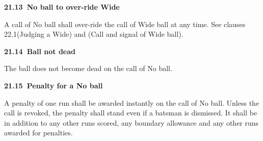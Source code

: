 \documentclass[12pt]{article}
\begin{document}
\vspace{\baselineskip}
{\fontsize{11pt}{13.2pt}\selectfont \textbf{21.13\  No ball to over-ride Wide}\par}\par


\vspace{\baselineskip}
\begin{adjustwidth}{0.0in}{0.01in}
{\fontsize{9pt}{10.8pt}\selectfont A call of No ball shall over-ride the call of Wide ball at any time. See clauses 22.1(Judging a Wide) and (Call and signal of Wide ball).\par}\par

\end{adjustwidth}


\vspace{\baselineskip}
{\fontsize{11pt}{13.2pt}\selectfont \textbf{21.14\  Ball not dead}\par}\par


\vspace{\baselineskip}
{\fontsize{9pt}{10.8pt}\selectfont The ball does not become dead on the call of No ball.\par}\par


\vspace{\baselineskip}

\vspace{\baselineskip}

\vspace{\baselineskip}

\vspace{\baselineskip}

\vspace{\baselineskip}
\begin{Center}
{\fontsize{8pt}{9.6pt}\par}
\end{Center}\par


\vspace{\baselineskip}
{\fontsize{11pt}{13.2pt}\selectfont \textbf{21.15\  Penalty for a No ball}\par}\par


\vspace{\baselineskip}
\begin{adjustwidth}{0.0in}{0.21in}
{\fontsize{9pt}{10.8pt}\selectfont A penalty of one run shall be awarded instantly on the call of No ball. Unless the call is revoked, the penalty shall stand even if a batsman is dismissed. It shall be in addition to any other runs scored, any boundary allowance and any other runs awarded for penalties.\par}\par

\end{adjustwidth}
\end{document}
